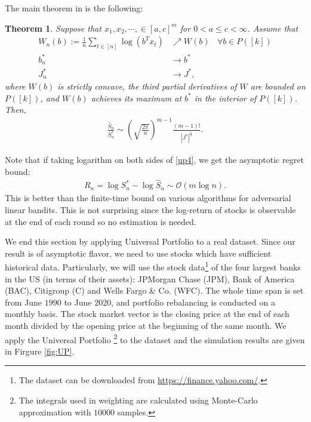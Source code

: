 \documentclass[letterpaper,11pt,openright,openany]{book}
\numberwithin{equation}{section}
\theoremstyle{plain}
\newtheorem{Th}{Theorem}[section]
\theoremstyle{definition}
\begin{document}
The main theorem in \cite{cover2011universal} is the following:
\begin{Th}
Suppose that $x_1, x_2, \cdots, \in [a, c]^m$ for $0<a\leq c<\infty$. Assume that 
\begin{align*}
W_n(b):=\frac{1}{n}\sum_{t\in [n]}\log(b^Tx_t)&\nearrow W(b)\ \ \ \ \forall b\in P([k])\\
b_n^*&\to b^*\\
J_n^*&\to J^*,
\end{align*}
where $W(b)$ is strictly concave, the third partial derivatives of $W$ are bounded on $P([k])$, and $W(b)$ achieves its maximum at $b^*$ in the interior of $P([k])$. Then,
\begin{align}
\frac{\hat{S}_n}{S_n^*}\sim\left(\sqrt{\frac{2\pi}{n}}\right)^{m-1}\frac{(m-1)!}{|J^*|^{\frac{1}{2}}}.\label{up4}
\end{align}
\end{Th}
Note that if taking logarithm on both sides of \eqref{up4}, we get the asymptotic regret bound:
\begin{align*}
R_n = \log S_n^*-\log\hat{S}_n\sim \mathcal O\left(m\log n\right). 
\end{align*}
This is better than the finite-time bound on various algorithms for adversarial linear bandits. This is not surprising since the log-return of stocks is observable at the end of each round so no estimation is needed. 

We end this section by applying Universal Portfolio to a real dataset. 
Since our result is of asymptotic flavor, we need to use stocks which have sufficient historical data. 
Particularly, we will use the stock data\footnote{The dataset can be downloaded from \href{https://finance.yahoo.com/}{https://finance.yahoo.com/}.} of the four largest banks in the US (in terms of their assets): JPMorgan Chase (JPM), Bank of America (BAC), Citigroup (C) and Wells Fargo \& Co. (WFC). 
The whole time span is set from June $1990$ to June $2020$, and portfolio rebalancing is conducted on a monthly basis. 
The stock market vector is the closing price at the end of each month divided by the opening price at the beginning of the same month.
We apply the Universal Portfolio \footnote{The integrals used in weighting are calculated using Monte-Carlo approximation with $10000$ samples.} to the dataset and the simulation results are given in Firgure \ref{fig:UP}.
\end{document}
